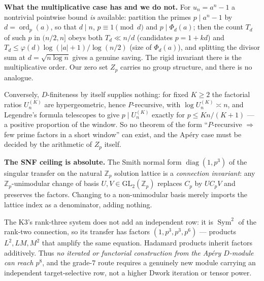 \medskip
\noindent\textbf{What the multiplicative case has and we do not.}  For $u_n=a^n-1$ a nontrivial
pointwise bound \emph{is} available: partition the primes $p\mid a^n-1$ by $d=\operatorname{ord}_p(a)$,
so that $d\mid n$, $p\equiv1\pmod d$ and $p\mid\Phi_d(a)$; then the count $T_d$ of such $p$ in
$(n/2,n]$ obeys both $T_d\ll n/d$ (candidates $p=1+kd$) and
$T_d\le\varphi(d)\log(|a|+1)/\log(n/2)$ (size of $\Phi_d(a)$), and splitting the divisor sum at
$d=\sqrt{n\log n}$ gives a genuine saving.  The rigid invariant there is the multiplicative
order.  Our zero set $Z_p$ carries no group structure, and there is no analogue.

Conversely, $D$-finiteness by itself supplies nothing: for fixed $K\ge2$ the factorial ratios
$U^{(K)}_n$ are hypergeometric, hence $P$-recursive, with $\log U^{(K)}_n\asymp n$, and Legendre's
formula telescopes to give $p\mid U^{(K)}_n$ exactly for $p\le Kn/(K+1)$ — a positive proportion
of the window.  So no theorem of the form ``$P$-recursive $\Rightarrow$ few prime factors in a
short window'' can exist, and the Ap\'ery case must be decided by the arithmetic of $Z_p$ itself.

\medskip
\noindent\textbf{The SNF ceiling is absolute.}  The Smith normal form $\operatorname{diag}(1,p^3)$
of the singular transfer on the natural $\mathbb Z_p$ solution lattice is a \emph{connection
invariant}: any $\mathbb Z_p$-unimodular change of basis $U,V\in\mathrm{GL}_2(\mathbb Z_p)$
replaces $C_p$ by $UC_pV$ and preserves the factors.  Changing to a non-unimodular basis merely
imports the lattice index as a denominator, adding nothing.

The K3's rank-three system does not add an independent row: it is $\operatorname{Sym}^2$ of the
rank-two connection, so its transfer has factors $(1,p^3,p^3,p^6)$ — products $L^2,LM,M^2$ that
amplify the same equation.  Hadamard products inherit factors additively.  Thus \emph{no iterated
or functorial construction from the Ap\'ery $D$-module can reach $p^8$}, and the grade-$7$ route
requires a genuinely new module carrying an independent target-selective row, not a higher Dwork
iteration or tensor power.

